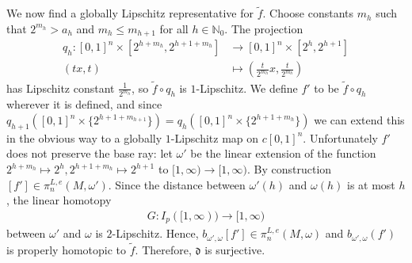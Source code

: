 \documentclass[a4paper,11pt]{article}
\theoremstyle{definition}
\theoremstyle{plain}
\theoremstyle{remark}
\begin{document}
{We now find a globally Lipschitz representative for $\tilde{f}$. Choose constants $m_h$ such that $2^{m_h} > a_h$ and $m_h \leq m_{h+1}$ for all $h\in \mathbb{N}_{0}$. The projection
\begin{align*}
q_{h}: [0,1]^n \times [2^{h+m_{h}}, 2^{h+1+m_{h}}] &\rightarrow [0,1]^n \times [2^{h}, 2^{h+1}]\\
 (tx,t)&\mapsto (\frac{t}{2^{m_{h}}}x, \frac{t}{2^{m_{h}}})
\end{align*}
has Lipschitz constant $\frac{1}{2^{m_{h}}}$, so $\tilde{f}\circ q_h$ is $1$-Lipschitz. We define $f'$ to be $\tilde{f}\circ q_h$ wherever it is defined, and since $q_{h+1}([0,1]^n \times \{2^{h+1+m_{h+1}}\}) = q_{h}([0,1]^n \times \{2^{h+1+m_h}\})$ we can extend this in the obvious way to a globally $1$-Lipschitz map on $c[0,1]^n$. Unfortunately $f'$ does not preserve the base ray: let $\omega'$ be the linear extension of the function $2^{h+m_{h}}\mapsto 2^{h}, 2^{h+1+m_{h}}\mapsto 2^{h+1}$ to $[1, \infty)\rightarrow [1,\infty)$. By construction $[f']\in \pi_{n}^{L,e}(M,\omega')$. Since the distance between $\omega'(h)$ and $\omega(h)$ is at most $h$, the linear homotopy 
\begin{align*}
G:I_{p}([1,\infty))\rightarrow [1,\infty)
\end{align*}
between $\omega'$ and $\omega$ is $2$-Lipschitz. Hence, $b_{\omega',\omega}[f'] \in \pi_{n}^{L,e}(M,\omega)$ and $b_{\omega',\omega}(f')$ is properly homotopic to $\tilde{f}$. Therefore, $\mathfrak{d}$ is surjective. \\

}
\end{document}
